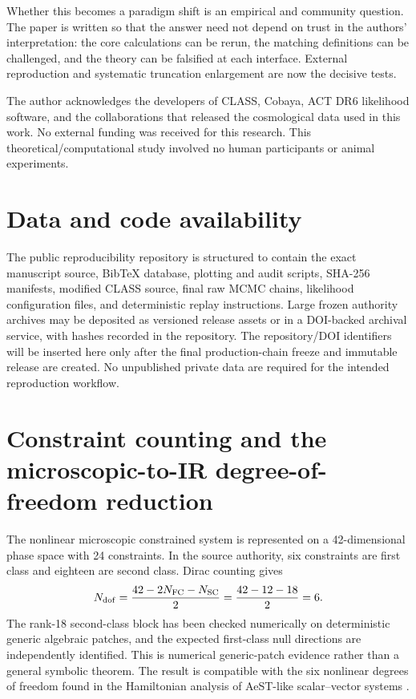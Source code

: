 \documentclass[12pt]{iopart}
\begin{document}
Whether this becomes a paradigm shift is an empirical and community question.  The paper is written so that the answer need not depend on trust in the authors' interpretation: the core calculations can be rerun, the matching definitions can be challenged, and the theory can be falsified at each interface.  External reproduction and systematic truncation enlargement are now the decisive tests.

\ack
The author acknowledges the developers of CLASS, Cobaya, ACT DR6 likelihood software, and the collaborations that released the cosmological data used in this work.  No external funding was received for this research.  This theoretical/computational study involved no human participants or animal experiments.

\section*{Data and code availability}
The public reproducibility repository is structured to contain the exact manuscript source, BibTeX database, plotting and audit scripts, SHA-256 manifests, modified CLASS source, final raw MCMC chains, likelihood configuration files, and deterministic replay instructions.  Large frozen authority archives may be deposited as versioned release assets or in a DOI-backed archival service, with hashes recorded in the repository.  The repository/DOI identifiers will be inserted here only after the final production-chain freeze and immutable release are created.  No unpublished private data are required for the intended reproduction workflow.

\appendix

\section{Constraint counting and the microscopic-to-IR degree-of-freedom reduction}
\label{app:constraints}

The nonlinear microscopic constrained system is represented on a 42-dimensional phase space with 24 constraints.  In the source authority, six constraints are first class and eighteen are second class.  Dirac counting gives
\begin{equation}
N_{\rm dof}=\frac{42-2N_{\rm FC}-N_{\rm SC}}{2}
=\frac{42-12-18}{2}=6.
\label{eq:dof6}
\end{equation}
The rank-18 second-class block has been checked numerically on deterministic generic algebraic patches, and the expected first-class null directions are independently identified.  This is numerical generic-patch evidence rather than a general symbolic theorem.  The result is compatible with the six nonlinear degrees of freedom found in the Hamiltonian analysis of AeST-like scalar--vector systems \cite{BatakiSkordisZlosnik2024}.
\end{document}
